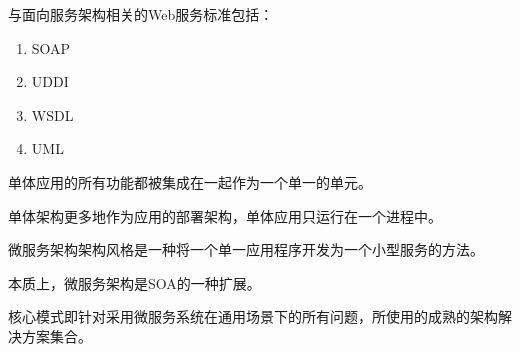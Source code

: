 \begin{problem}
	与面向服务架构相关的Web服务标准包括：
    \vspace{-0.8em}
    \begin{multicols}{4}
        \begin{enumerate}[label=\Alph*.]
            \item SOAP
            \item UDDI
            \item WSDL
            \item UML
        \end{enumerate}
    \end{multicols}
    \vspace{-1em}
\end{problem}



\begin{problem}
	单体应用的所有功能都被集成在一起作为一个单一的单元。
\end{problem}



\begin{problem}
	单体架构更多地作为应用的部署架构，单体应用只运行在一个进程中。
\end{problem}



\begin{problem}
	微服务架构架构风格是一种将一个单一应用程序开发为一个小型服务的方法。
\end{problem}



\begin{problem}
	本质上，微服务架构是SOA的一种扩展。
\end{problem}



\begin{problem}
	核心模式即针对采用微服务系统在通用场景下的所有问题，所使用的成熟的架构解决方案集合。
\end{problem}
